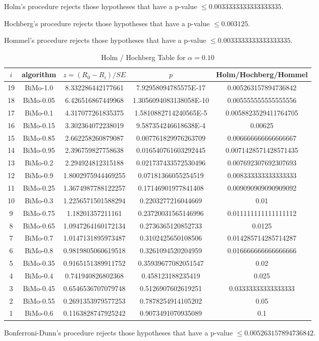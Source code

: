 \documentclass[a4paper,10pt]{article}
\begin{document}
\begin{landscape}
Holm's procedure rejects those hypotheses that have a p-value $\le0.0033333333333333335$.


Hochberg's procedure rejects those hypotheses that have a p-value $\le0.003125$.


Hommel's procedure rejects those hypotheses that have a p-value $\le0.0033333333333333335$.


\begin{table}[!htp]
\centering\tiny
\caption{Holm / Hochberg Table for $\alpha=0.10$}
\begin{tabular}{ccccc}
$i$&algorithm&$z=(R_0 - R_i)/SE$&$p$&Holm/Hochberg/Hommel\\
\hline
19&BiMo-1.0&8.332286442177661&7.92958094785575E-17&0.005263157894736842\\
18&BiMo-0.05&6.426516867449968&1.3056094083138058E-10&0.005555555555555556\\
17&BiMo-0.1&4.317077261835375&1.5810882714240565E-5&0.0058823529411764705\\
16&BiMo-0.15&3.302364072238019&9.587354246618638E-4&0.00625\\
15&BiMo-0.85&2.662258260879087&0.007761829976263709&0.006666666666666667\\
14&BiMo-0.95&2.396759827758638&0.016540761603292445&0.0071428571428571435\\
13&BiMo-0.2&2.294924812315188&0.021737433572530496&0.007692307692307693\\
12&BiMo-0.9&1.8002975944469255&0.07181366055254519&0.008333333333333333\\
11&BiMo-0.25&1.3674987788122257&0.17146901977841408&0.009090909090909092\\
10&BiMo-0.3&1.2256571501588294&0.2203277216044669&0.01\\
9&BiMo-0.75&1.18201357211161&0.23720031565146996&0.011111111111111112\\
8&BiMo-0.65&1.0947264160172134&0.2736365120852733&0.0125\\
7&BiMo-0.7&1.0147131895973487&0.3102425650108506&0.014285714285714287\\
6&BiMo-0.8&0.9819805060619518&0.3261094520204959&0.016666666666666666\\
5&BiMo-0.35&0.9165151389911752&0.35939677082051547&0.02\\
4&BiMo-0.4&0.741940826802368&0.458123188235419&0.025\\
3&BiMo-0.45&0.6546536707079748&0.5126907602619251&0.03333333333333333\\
2&BiMo-0.55&0.2691353979577253&0.7878254914105202&0.05\\
1&BiMo-0.6&0.1163828747925242&0.9073491070935089&0.1\\
\hline
\end{tabular}
\end{table}
Bonferroni-Dunn's procedure rejects those hypotheses that have a p-value $\le0.005263157894736842$.



\end{landscape}
\end{document}
